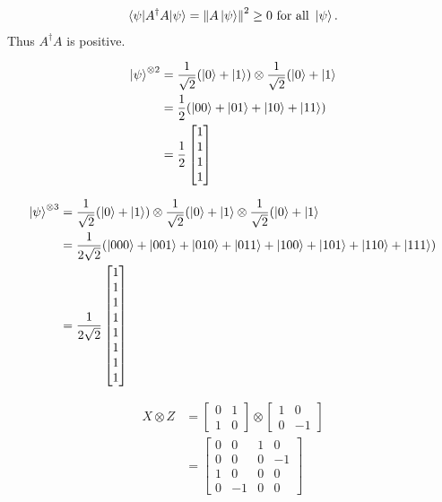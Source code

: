 \begin{align*}
	\braket{\psi | A^\dagger A | \psi} = \left\lVert A \ket{\psi}\right\rVert^2 \geq 0 \text{ for all } \ket{\psi}.
\end{align*}
Thus $A^\dagger A$ is positive.


\begin{align*}
	\ket{\psi}^{\otimes 2} &= \frac{1}{\sqrt{2}} (\ket{0} + \ket{1}) \otimes \frac{1}{\sqrt{2}} (\ket{0} + \ket{1}\\
		&= \frac{1}{2} (\ket{00}  + \ket{01} + \ket{10} + \ket{11}  )\\
		&= \frac{1}{2} \begin{bmatrix}
			1 \\ 
			1 \\ 
			1 \\ 
			1
		\end{bmatrix}
\end{align*}

\begin{align*}
	\ket{\psi}^{\otimes 3} &= \frac{1}{\sqrt{2}} (\ket{0} + \ket{1}) \otimes \frac{1}{\sqrt{2}} (\ket{0} + \ket{1}  \otimes \frac{1}{\sqrt{2}} (\ket{0} + \ket{1}\\
		&= \frac{1}{2\sqrt{2}} (\ket{000}  + \ket{001} + \ket{010} + \ket{011} +  \ket{100}  + \ket{101} + \ket{110} + \ket{111})\\
		&= \frac{1}{2\sqrt{2}} \begin{bmatrix}
			1 \\ 
			1 \\ 
			1 \\ 
			1 \\
			1 \\
			1 \\
			1 \\
			1
		\end{bmatrix}
\end{align*}


\begin{align*}
	X \otimes Z &= \begin{bmatrix}
		0 & 1 \\ 
		1 & 0
	\end{bmatrix}
	\otimes
	\begin{bmatrix}
		1 & 0 \\ 
		0 & -1
	\end{bmatrix} \\
	&= \begin{bmatrix}
		0 & 0 & 1 & 0 \\ 
		0 & 0 & 0 & -1 \\ 
		1 & 0 & 0 & 0 \\ 
		0 & -1 & 0 & 0
	\end{bmatrix}
\end{align*}

